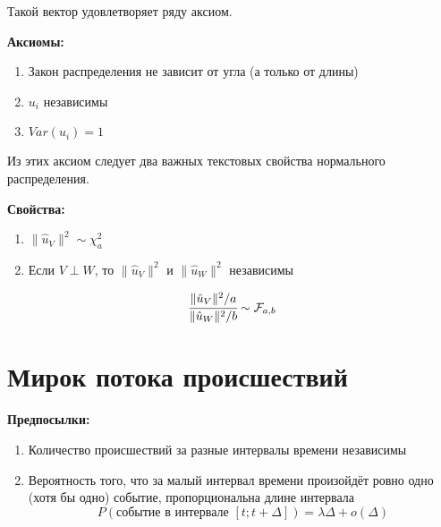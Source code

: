 \documentclass[12pt]{article} %
\theoremstyle{definition} %
\def \hu{\hat{u}}
\def \cF{\mathcal{F}}
\def \cChi{\mathcal{\chi}}
\begin{document}
\begin{center}
\end{center}
    
    Такой вектор удовлетворяет ряду аксиом.
    \par
    \textbf{Аксиомы:}
    \begin{enumerate}
        \item Закон распределения не зависит от угла (а только от длины) 
        \item $u_i$ независимы
        \item $Var(u_i) = 1$
    \end{enumerate} 
    Из этих аксиом следует два важных текстовых свойства нормального распределения.
    \par
    \textbf{Свойства:}
    \begin{enumerate}    
    \item ${\lVert \hu_V \rVert ^2} \sim\cChi_{a}^2$ 
    \item Если $ V \perp W $, то $ {\lVert \hu_V \rVert ^2} $ и  $ {\lVert \hu_W \rVert ^2} $ независимы
    \end{enumerate}

    
    \[
        \cfrac{\lVert \hu_V \rVert ^2 / a}{\lVert \hu_W \rVert ^2 / b}  \sim \cF_{a,b}
    \]
\newpage
\section{Мирок потока происшествий}
    \textbf{Предпосылки:}
    \begin{enumerate}
        \item Количество происшествий за разные интервалы времени независимы
        \item Вероятность того, что за малый интервал времени произойдёт ровно одно (хотя бы одно) событие, пропорциональна длине интервала
        \[
            P(\text{событие в интервале } [t; t + \Delta]) = \lambda\Delta + o(\Delta)
        \]
    \end{enumerate} 
\end{document}
